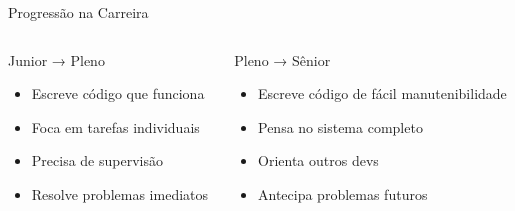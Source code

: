 \documentclass[10pt, aspectratio=169]{beamer}
\begin{document}
\begin{frame}{Progressão na Carreira}
\begin{columns}
\begin{column}{0.5\textwidth}
\begin{block}{Junior → Pleno}
\begin{itemize}
    \item Escreve código que funciona
    \item Foca em tarefas individuais
    \item Precisa de supervisão
    \item Resolve problemas imediatos
\end{itemize}
\end{block}
\end{column}
\begin{column}{0.5\textwidth}
\begin{block}{Pleno → Sênior}
\begin{itemize}
    \item Escreve código de fácil manutenibilidade
    \item Pensa no sistema completo
    \item Orienta outros devs
    \item Antecipa problemas futuros
\end{itemize}
\end{block}
\end{column}
\end{columns}

\vspace{0.5cm}
\begin{center}
\end{center}
\end{frame}
\end{document}
